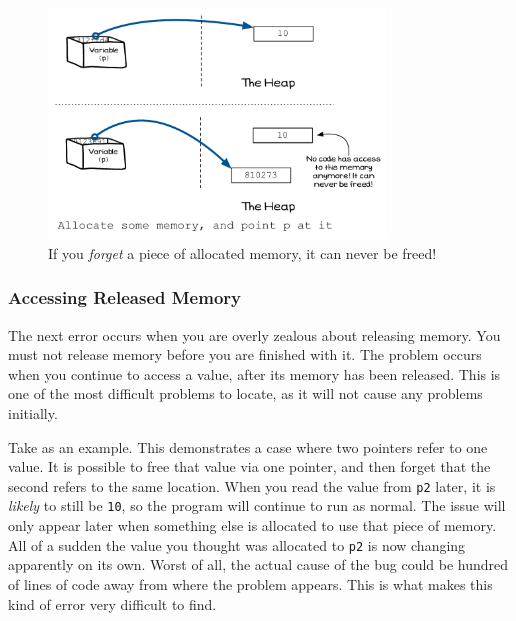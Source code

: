 \begin{figure}[h]
   \centering
   \includegraphics[width=0.8\textwidth]{./topics/dynamic-memory/diagrams/MemoryLeak} 
   \caption{If you \emph{forget} a piece of allocated memory, it can never be freed!}
   \label{fig:memory_leak}
\end{figure}


\clearpage
\subsubsection{Accessing Released Memory} %
\label{ssub:accessing_released_memory}

The next error occurs when you are overly zealous about releasing memory. You must not release memory before you are finished with it. The problem occurs when you continue to access a value, after its memory has been released. This is one of the most difficult problems to locate, as it will not cause any problems initially. 

Take  as an example. This demonstrates a case where two pointers refer to one value. It is possible to free that value via one pointer, and then forget that the second refers to the same location. When you read the value from \texttt{p2} later, it is \emph{likely} to still be \texttt{10}, so the program will continue to run as normal. The issue will only appear later when something else is allocated to use that piece of memory. All of a sudden the value you thought was allocated to \texttt{p2} is now changing apparently on its own. Worst of all, the actual cause of the bug could be hundred of lines of code away from where the problem appears. This is what makes this kind of error very difficult to find.

